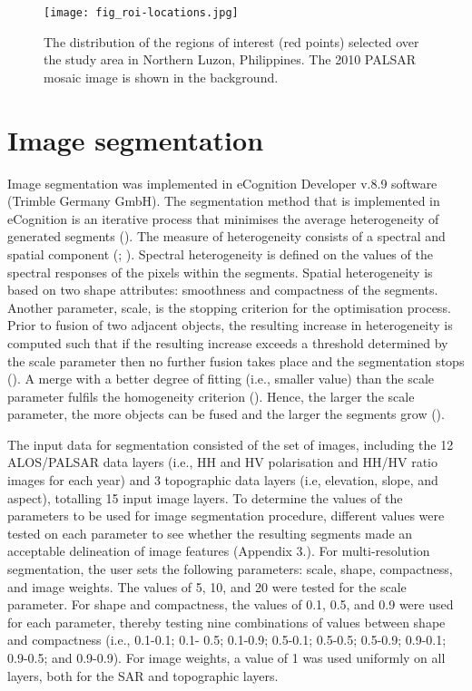\begin{figure}
	\centering
	\texttt{[image: fig\_roi-locations.jpg]}
	\caption[The distribution of the regions of interest selected over the study area in Northern Luzon, Philippines.]{The distribution of the regions of interest (red points) selected over the study area in Northern Luzon, Philippines. The 2010 PALSAR mosaic image is shown in the background.}
	\label{fig: method-fig3.5}
\end{figure}

\section{Image segmentation}
\label{sec: method-segmentation}

Image segmentation was implemented in eCognition Developer v.8.9 software (Trimble Germany GmbH). The segmentation method that is implemented in eCognition is an iterative process that minimises the average heterogeneity of generated segments (\cite{baatz_multi-resolution_2000}). The measure of heterogeneity consists of a spectral and spatial component (\cite{benz_multi-resolution_2004}; \cite{happ_multi-resolution_2010}). Spectral heterogeneity is defined on the values of the spectral responses of the pixels within the segments. Spatial heterogeneity is based on two shape attributes: smoothness and compactness of the segments. Another parameter, scale, is the stopping criterion for the optimisation process. Prior to fusion of two adjacent objects, the resulting increase in heterogeneity is computed such that if the resulting increase exceeds a threshold determined by the scale parameter then no further fusion takes place and the segmentation stops (\cite{benz_multi-resolution_2004}). A merge with a better degree of fitting (i.e., smaller value) than the scale parameter fulfils the homogeneity criterion (\cite{baatz_multi-resolution_2000}). Hence, the larger the scale parameter, the more objects can be fused and the larger the segments grow (\cite{baatz_multi-resolution_2000}).

The input data for segmentation consisted of the set of images, including the 12 ALOS/PALSAR data layers (i.e., HH and HV polarisation and HH/HV ratio images for each year) and 3 topographic data layers (i.e, elevation, slope, and aspect), totalling 15 input image layers. To determine the values of the parameters to be used for image segmentation procedure, different values were tested on each parameter to see whether the resulting segments made an acceptable delineation of image features (Appendix 3.). For multi-resolution segmentation, the user sets the following parameters: scale, shape, compactness, and image weights. The values of 5, 10, and 20 were tested for the scale parameter. For shape and compactness, the values of 0.1, 0.5, and 0.9 were used for each parameter, thereby testing nine combinations of values between shape and compactness (i.e., 0.1-0.1; 0.1- 0.5; 0.1-0.9; 0.5-0.1; 0.5-0.5; 0.5-0.9; 0.9-0.1; 0.9-0.5; and 0.9-0.9). For image weights, a value of 1 was used uniformly on all layers, both for the SAR and topographic layers.

